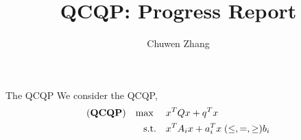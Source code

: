 \documentclass[aspectratio=1610, 9pt]{beamer}
\newcommand{\model}[1]{(\textbf{#1})}
\newcommand{\mx}{\mathbf{\max}\;}
\begin{document}
\title{QCQP: Progress Report}

\author{
  Chuwen Zhang
}
\maketitle

\begin{frame}{The QCQP}
  We consider the QCQP,
  \begin{equation}
    \label{eq:inhoqcqp}
    \begin{aligned}
      \model{QCQP} \quad \mx \quad & x^T Qx + q^T x                                        \\
      \textrm{s.t.} \quad          & x^T A_i x + a_i^T x \hspace{0.27em} (\le, =, \ge) b_i \\
    \end{aligned}
  \end{equation}
\end{frame}
\end{document}

